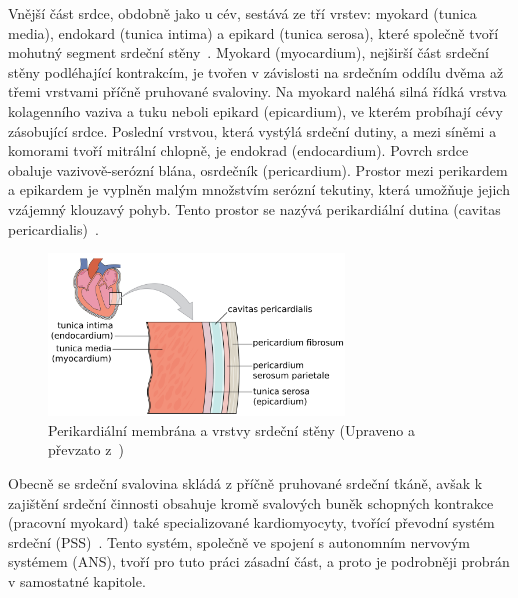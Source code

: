 Vnější část srdce, obdobně jako u cév, sestává ze tří vrstev: myokard (tunica
media), endokard (tunica intima) a epikard (tunica serosa), které společně tvoří
mohutný segment srdeční stěny~\cite{Memorix2017}. Myokard (myocardium), nejširší
část srdeční stěny podléhající kontrakcím, je tvořen v závislosti na srdečním
oddílu dvěma až třemi vrstvami příčně pruhované svaloviny. Na myokard naléhá
silná řídká vrstva kolagenního vaziva a tuku neboli epikard (epicardium), ve
kterém probíhají cévy zásobující srdce. Poslední vrstvou, která vystýlá srdeční
dutiny, a mezi síněmi a komorami tvoří mitrální chlopně, je endokrad
(endocardium). Povrch srdce obaluje vazivově-serózní blána, osrdečník
(pericardium). Prostor mezi perikardem a epikardem je vyplněn malým množstvím
serózní tekutiny, která umožňuje jejich vzájemný klouzavý pohyb. Tento prostor
se nazývá perikardiální dutina (cavitas
pericardialis)~\cite{Weinhaus2005,Dylevsky2013}.

\begin{figure}[h]
	\begin{center}
		\includegraphics[width=0.7\textwidth]{../assets/anatomy/heart_muscle}
		\caption{Perikardiální membrána a vrstvy srdeční stěny (Upraveno a
			převzato z~\cite{OpenStax})}
		\label{fig:heartlayers}
	\end{center}
\end{figure}

Obecně se srdeční svalovina skládá z příčně pruhované srdeční tkáně, avšak k
zajištění srdeční činnosti obsahuje kromě svalových buněk schopných kontrakce
(pracovní myokard) také specializované kardiomyocyty, tvořící převodní systém
srdeční (PSS)~\cite{Memorix2017,Dylevsky2013}. Tento systém, společně ve spojení
s autonomním nervovým systémem (ANS), tvoří pro tuto práci zásadní část, a proto
je podrobněji probrán v samostatné kapitole.

